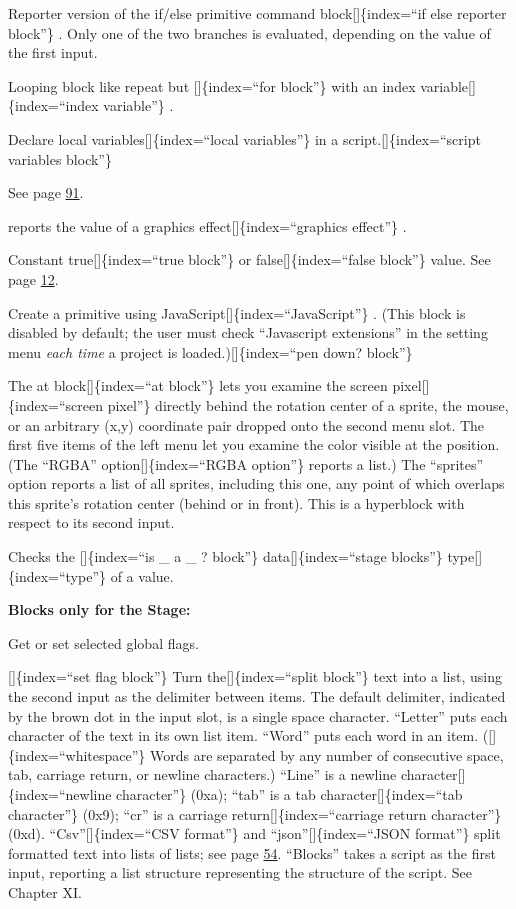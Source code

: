 \documentclass[
  letterpaper,
]{book}
\begin{document}
Reporter version of the if/else primitive command
block{[}{]}\{index=``if else reporter block''\} . Only one of the two
branches is evaluated, depending on the value of the first input.

Looping block like repeat but {[}{]}\{index=``for block''\} with an
index variable{[}{]}\{index=``index variable''\} .

Declare local variables{[}{]}\{index=``local variables''\} in a
script.{[}{]}\{index=``script variables block''\}

See page \hyperref[url]{91}.

reports the value of a graphics effect{[}{]}\{index=``graphics
effect''\} .

Constant true{[}{]}\{index=``true block''\} or
false{[}{]}\{index=``false block''\} value. See page
\hyperref[predicates-and-conditional-evaluation]{12}.

Create a primitive using JavaScript{[}{]}\{index=``JavaScript''\} .
(This block is disabled by default; the user must check ``Javascript
extensions'' in the setting menu \emph{each time} a project is
loaded.){[}{]}\{index=``pen down? block''\}

The at block{[}{]}\{index=``at block''\} lets you examine the screen
pixel{[}{]}\{index=``screen pixel''\} directly behind the rotation
center of a sprite, the mouse, or an arbitrary (x,y) coordinate pair
dropped onto the second menu slot. The first five items of the left menu
let you examine the color visible at the position. (The ``RGBA''
option{[}{]}\{index=``RGBA option''\} reports a list.) The ``sprites''
option reports a list of all sprites, including this one, any point of
which overlaps this sprite's rotation center (behind or in front). This
is a hyperblock with respect to its second input.

Checks the {[}{]}\{index=``is \_ a \_ ? block''\}
data{[}{]}\{index=``stage blocks''\} type{[}{]}\{index=``type''\} of a
value.

\textbf{Blocks only for the Stage:}

Get or set selected global flags.

{[}{]}\{index=``set flag block''\} Turn the{[}{]}\{index=``split
block''\} text into a list, using the second input as the delimiter
between items. The default delimiter, indicated by the brown dot in the
input slot, is a single space character. ``Letter'' puts each character
of the text in its own list item. ``Word'' puts each word in an item.
({[}{]}\{index=``whitespace''\} Words are separated by any number of
consecutive space, tab, carriage return, or newline characters.)
``Line'' is a newline character{[}{]}\{index=``newline character''\}
(0xa); ``tab'' is a tab character{[}{]}\{index=``tab character''\}
(0x9); ``cr'' is a carriage return{[}{]}\{index=``carriage return
character''\} (0xd). ``Csv''{[}{]}\{index=``CSV format''\} and
``json''{[}{]}\{index=``JSON format''\} split formatted text into lists
of lists; see page \hyperref[comma-separated-values]{54}. ``Blocks''
takes a script as the first input, reporting a list structure
representing the structure of the script. See Chapter XI.
\end{document}
